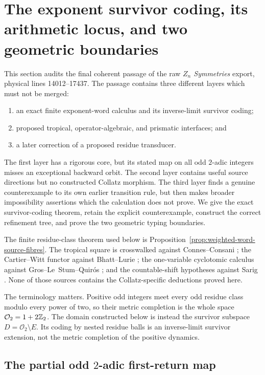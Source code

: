 \section{The exponent survivor coding, its arithmetic locus, and two geometric boundaries}
\label{sec:symbolic-completion-geometric-boundaries}

This section audits the final coherent passage of the raw
\emph{$Z_n$ Symmetries} export, physical lines 14012--17437.  The passage
contains three different layers which must not be merged:
\begin{enumerate}[label=\textup{(\roman*)}]
\item an exact finite exponent-word calculus and its inverse-limit survivor
  coding;
\item proposed tropical, operator-algebraic, and prismatic interfaces; and
\item a later correction of a proposed residue transducer.
\end{enumerate}
The first layer has a rigorous core, but its stated map on all odd
$2$-adic integers misses an exceptional backward orbit.  The second layer
contains useful source directions but no constructed Collatz morphism.  The
third layer finds a genuine counterexample to its own earlier transition
rule, but then makes broader impossibility assertions which the calculation
does not prove.  We give the exact survivor-coding theorem, retain the explicit
counterexample, construct the correct refinement tree, and prove the two
geometric typing boundaries.

The finite residue-class theorem used below is
Proposition~\ref{prop:weighted-word-source-fibres}.  The tropical square is
crosswalked against Connes--Consani \cite{ConnesConsani2016}; the
Cartier--Witt functor against Bhatt--Lurie \cite{BhattLurieWCart}; the
one-variable cyclotomic calculus against Gros--Le~Stum--Quir\'os
\cite{GrosLeStumQuiros2025}; and the countable-shift hypotheses against
Sarig \cite{Sarig1999,Sarig2003,Sarig2015}.  None of those sources contains the
Collatz-specific deductions proved here.

The terminology matters.  Positive odd integers meet every odd residue class
modulo every power of two, so their metric completion is the whole space
$\mathcal O_2=1+2\mathbb{Z}_{2}$.  The domain constructed below is instead the
survivor subspace $D=\mathcal O_2\setminus E$.  Its coding by nested residue
balls is an inverse-limit survivor extension, not the metric completion of the
positive dynamics.

\subsection{The partial odd \texorpdfstring{$2$}{2}-adic first-return map}

